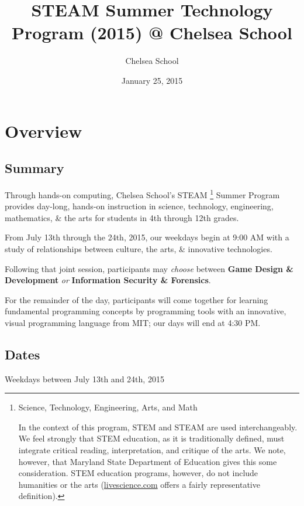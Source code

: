 \documentclass[letterpaper,10pt,english]{sphinxmanual}
\title{STEAM Summer Technology Program (2015) @ Chelsea School}
\date{January 25, 2015}
\author{Chelsea School}
\begin{document}
\maketitle
\tableofcontents
{}\label{indepth::doc}



\chapter{Overview}
\label{description:overview}\label{description:steam-summer-technology-program-2015}\label{description::doc}

\section{Summary}
\label{description:summary}
Through hands-on computing, Chelsea School's STEAM \footnote{
Science, Technology, Engineering, Arts, and Math

In the context of this program, STEM and STEAM are used interchangeably. We feel strongly that STEM education, as it is traditionally defined, must integrate critical reading, interpretation, and critique of the arts. We note, however, that Maryland State Department of Education gives this some consideration. STEM education programs, however, do not include humanities or the arts (\href{http://www.livescience.com/43296-what-is-stem-education.html}{livescience.com} offers a fairly representative definition).
} Summer Program provides day-long, hands-on instruction in science, technology, engineering, mathematics, \& the arts for students in 4th through 12th grades.

From July 13th through the 24th, 2015, our weekdays begin at 9:00 AM with a study of relationships between culture, the arts, \& innovative technologies.

Following that joint session, participants may \emph{choose} between \textbf{Game Design \& Development} \emph{or} \textbf{Information Security \& Forensics}.

For the remainder of the day, participants will come together for learning fundamental programming concepts by programming tools with an innovative, visual programming language from MIT; our days will end at 4:30 PM.


\section{Dates}
\label{description:dates}
Weekdays between July 13th and 24th, 2015
\end{document}
